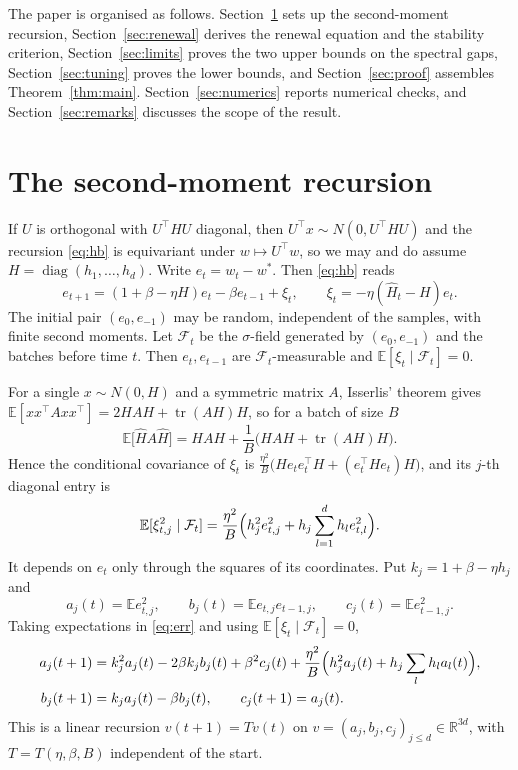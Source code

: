 \documentclass[11pt]{amsart}
\theoremstyle{definition}
\theoremstyle{remark}
\numberwithin{equation}{section}
\newcommand{\tr}{\operatorname{tr}}
\newcommand{\E}{\mathbb{E}}
\newcommand{\R}{\mathbb{R}}
\begin{document}
The paper is organised as follows. Section~\ref{sec:setup} sets up the second-moment recursion, Section~\ref{sec:renewal} derives the renewal equation and the stability criterion, Section~\ref{sec:limits} proves the two upper bounds on the spectral gaps, Section~\ref{sec:tuning} proves the lower bounds, and Section~\ref{sec:proof} assembles Theorem~\ref{thm:main}. Section~\ref{sec:numerics} reports numerical checks, and Section~\ref{sec:remarks} discusses the scope of the result.

\section{The second-moment recursion}\label{sec:setup}

If $U$ is orthogonal with $U^\top HU$ diagonal, then $U^\top x\sim N(0,U^\top HU)$ and the recursion \eqref{eq:hb} is equivariant under $w\mapsto U^\top w$, so we may and do assume $H=\operatorname{diag}(h_1,\dots,h_d)$. Write $e_t=w_t-w^*$. Then \eqref{eq:hb} reads
\begin{equation}\label{eq:err}
e_{t+1}=(1+\beta-\eta H)e_t-\beta e_{t-1}+\xi_t,\qquad \xi_t=-\eta(\widehat H_t-H)e_t .
\end{equation}
The initial pair $(e_0,e_{-1})$ may be random, independent of the samples, with finite second moments. Let $\mathcal F_t$ be the $\sigma$-field generated by $(e_0,e_{-1})$ and the batches before time $t$. Then $e_t,e_{t-1}$ are $\mathcal F_t$-measurable and $\E[\xi_t\mid\mathcal F_t]=0$.

For a single $x\sim N(0,H)$ and a symmetric matrix $A$, Isserlis' theorem gives $\E[xx^\top Axx^\top]=2HAH+\tr(AH)H$, so for a batch of size $B$
\[
\E\bigl[\widehat H A\widehat H\bigr]=HAH+\frac1B\bigl(HAH+\tr(AH)H\bigr).
\]
Hence the conditional covariance of $\xi_t$ is $\frac{\eta^2}{B}\bigl(He_te_t^\top H+(e_t^\top He_t)H\bigr)$, and its $j$-th diagonal entry is
\begin{equation}\label{eq:noisevar}
\E[\xi_{t,j}^2\mid\mathcal F_t]=\frac{\eta^2}{B}\Bigl(h_j^2e_{t,j}^2+h_j\sum_{l=1}^dh_le_{t,l}^2\Bigr).
\end{equation}
It depends on $e_t$ only through the squares of its coordinates. Put $k_j=1+\beta-\eta h_j$ and
\[
a_j(t)=\E e_{t,j}^2,\qquad b_j(t)=\E e_{t,j}e_{t-1,j},\qquad c_j(t)=\E e_{t-1,j}^2 .
\]
Taking expectations in \eqref{eq:err} and using $\E[\xi_t\mid\mathcal F_t]=0$,
\begin{align}
a_j(t+1)&=k_j^2a_j(t)-2\beta k_jb_j(t)+\beta^2c_j(t)+\frac{\eta^2}{B}\Bigl(h_j^2a_j(t)+h_j\sum_lh_la_l(t)\Bigr),\notag\\
b_j(t+1)&=k_ja_j(t)-\beta b_j(t),\qquad c_j(t+1)=a_j(t).\label{eq:map}
\end{align}
This is a linear recursion $v(t+1)=Tv(t)$ on $v=(a_j,b_j,c_j)_{j\le d}\in\R^{3d}$, with $T=T(\eta,\beta,B)$ independent of the start.
\end{document}
